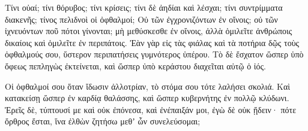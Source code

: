 {\par }{\PP {}Τίνι οὐαί; τίνι θόρυβος; τίνι κρίσεις; τίνι δὲ ἀηδίαι καὶ λέσχαι; τίνι συντρίμματα διακενῆς; τίνος πελιδνοὶ οἱ ὀφθαλμοί;
Οὐ τῶν ἐγχρονιζόντων ἐν οἴνοις; οὐ τῶν ἰχνευόντων ποῦ πότοι γίνονται; μὴ μεθύσκεσθε ἐν οἴνοις, ἀλλὰ ὁμιλεῖτε ἀνθρώποις δικαίοις καὶ ὁμιλεῖτε ἐν περιπάτοις.
Ἐὰν γὰρ εἰς τὰς φιάλας καὶ τὰ ποτήρια δῷς τοὺς ὀφθαλμούς σου, ὕστερον περιπατήσεις γυμνότερος ὑπέρου.
Τὸ δὲ ἔσχατον ὥσπερ ὑπὸ ὄφεως πεπληγὼς ἐκτείνεται, καὶ ὥσπερ ὑπὸ κεράστου διαχεῖται αὐτῷ ὁ ἰός.
\par }{\PP {}Οἱ ὀφθαλμοί σου ὅταν ἴδωσιν ἀλλοτρίαν, τὸ στόμα σου τότε λαλήσει σκολιά.
Καὶ κατακείσῃ ὥσπερ ἐν καρδίᾳ θαλάσσης, καὶ ὥσπερ κυβερνήτης ἐν πολλῷ κλύδωνι.
Ἐρεῖς δὲ, τύπτουσί με καὶ οὐκ ἐπόνεσα, καὶ ἐνέπαιξάν μοι, ἐγὼ δὲ οὐκ ᾔδειν· πότε ὄρθρος ἔσται, ἵνα ἐλθὼν ζητήσω μεθʼ ὧν συνελεύσομαι;

}
